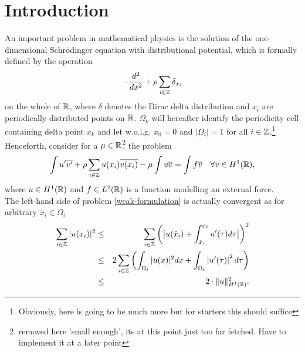 \chapter{Introduction}

An important problem in mathematical physics is the solution of the one-dimensional Schrödinger equation with distributional potential, which is formally defined by the operation
\begin{equation}
	- \frac{d^{2}}{dx^{2}} + \rho \sum_{i \in \mathbb{Z}} \delta_{x_{i}} \label{the-operator}
\end{equation}
on the whole of $\mathbb{R}$, where $\delta$ denotes the Dirac delta distribution and $x_{i}$ are periodically distributed points on $\mathbb{R}$. $\Omega_{k}$ will hereafter identify the periodicity cell containing delta point $x_{k}$ and let w.o.l.g. $x_{0} = 0$ and $|\Omega_{i}| = 1$ for all $i \in \mathbb{Z}$.\footnote{Obviously, here is going to be much more but for starters this should suffice} \\ %

Henceforth, consider for a $\mu \in \mathbb{R}$\footnote{removed here 'small enough', its at this point just too far fetched. Have to implement it at a later point} the problem %
\begin{equation}
	\int u' \overline{v'} + \rho \sum_{i \in \mathbb{Z}} u(x_{i}) \overline{v(x_{i})} - \mu \int u \overline{v} = \int f \overline{v} \quad \forall v \in H^{1}(\mathbb{R}), \label{weak-formulation}
\end{equation}	
where $u \in H^{1}(\mathbb{R})$ and $f \in L^{2}(\mathbb{R})$ is a function modelling an external force. \\	
The left-hand side of problem \eqref{weak-formulation} is actually convergent as for arbitrary $\tilde{x}_{i} \in \Omega_{i}$
\begin{eqnarray}
	\sum_{i \in \mathbb{Z}} |u(x_{i})|^{2} & \leq & \sum_{i \in \mathbb{Z}} \left( \big| u(\tilde{x}_{i}) + \int_{\tilde{x}_{i}}^{x_{i}} u'( \tau ) d\tau \big| \right)^{2} \notag \\
		 & \leq & 2 \sum_{i \in \mathbb{Z}} \left( \int_{\Omega_{i}} |u( x )|^{2} dx +  \int_{\Omega_{i}} \left| u'(\tau) \right|^{2} d\tau \right) \notag \\
		 & \leq & 2 \cdot \| u \|^{2}_{H^{1}(\mathbb{R})}. \label{eq:potentialestim}
\end{eqnarray}